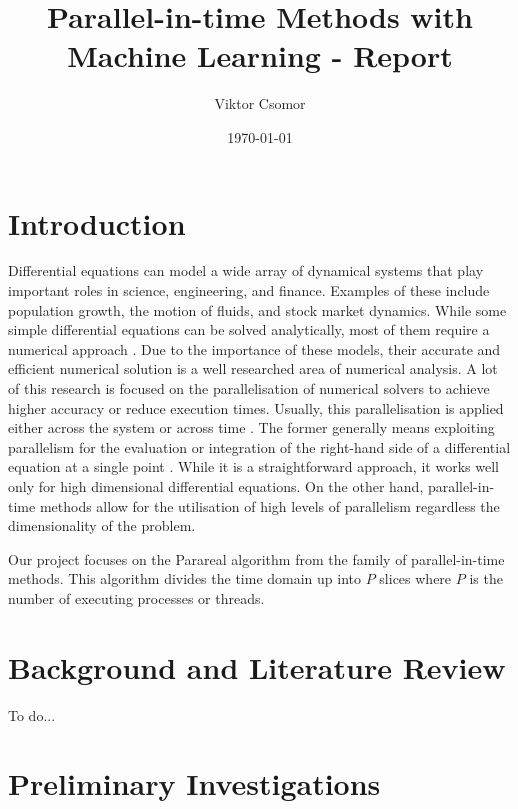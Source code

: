 \documentclass{article}
\begin{document}

\title{Parallel-in-time Methods with Machine Learning - Report}
\author{Viktor Csomor}
\date{\today}

\makeEPCCtitle

\newpage

\tableofcontents

\newpage
{}

\section{Introduction}

Differential equations can model a wide array of dynamical systems that play important roles in science, engineering, and finance. Examples of these include population growth, the motion of fluids, and stock market dynamics. While some simple differential equations can be solved analytically, most of them require a numerical approach \cite[p.~310]{suli2003}. Due to the importance of these models, their accurate and efficient numerical solution is a well researched area of numerical analysis. A lot of this research is focused on the parallelisation of numerical solvers to achieve higher accuracy or reduce execution times. Usually, this parallelisation is applied either across the system or across time \cite{gear1988}. The former generally means exploiting parallelism for the evaluation or integration of the right-hand side of a differential equation at a single point \cite[p.~1-2]{solodushkin2016}. While it is a straightforward approach, it works well only for high dimensional differential equations. On the other hand, parallel-in-time methods allow for the utilisation of high levels of parallelism regardless the dimensionality of the problem.

Our project focuses on the Parareal algorithm \cite{parareal} from the family of parallel-in-time methods. This algorithm divides the time domain up into $P$ slices where $P$ is the number of executing processes or threads.

\section{Background and Literature Review}

To do...

\section{Preliminary Investigations}
\end{document}
